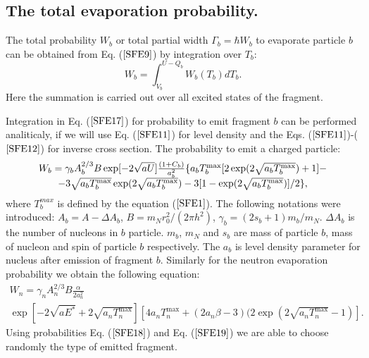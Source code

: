 \subsection{The total evaporation probability.} 

\hspace{1.0em}The total probability $W_b$ or total partial width
$\Gamma_b=\hbar W_b$ to evaporate particle $b$ can be obtained from 
Eq. ($\ref{SFE9}$) by integration over $T_b$:
\begin{equation}
\label{SFE17} 
W_{b}=\int_{V_b}^{U-Q_b} W_b(T_b)dT_b.
\end{equation}
Here the summation is carried out over all excited states of the
fragment.
 
Integration in Eq. ($\ref{SFE17}$) for probability to emit fragment $b$
can be performed analiticaly, if we will use Eq. ($\ref{SFE11}$) for level
density and the Eqs. ($\ref{SFE11}$)-($\ref{SFE12}$) for inverse cross
section.
The probability
to emit a charged particle:
\begin{equation}
\label{SFE18} 
\begin{array}{c}
W_{b}=\gamma _bA_b^{2/3}B\exp [-2 
\sqrt{aU}]\frac{(1+C_b)}{a_b^2}\{a_bT_b^{\max }[2\exp (2\sqrt{%
a_bT_b^{\max }})+1]- \\
- 3\sqrt{a_bT_b^{\max }}\exp (2\sqrt{a_bT_b^{\max }}%
)-3[1-\exp (2\sqrt{a_bT_b^{\max }})]/2\}, 
\end{array}
\end{equation}
where $T_b^{max}$ is defined by the equation ($\ref{SFE1}$).
The following notations were introduced: $A_b=A-\Delta A_b$, $%
B=m_Nr_0^2/(2\pi h^2)$, $\gamma _b=(2s_b+1)m_b/m_N$. $\Delta A_b$ is the
number of nucleons in $b$ particle. $m_b$, $m_N$ and $s_b$ are mass of
particle $b$, mass of nucleon and spin of particle $b$ respectively. 
  The $a_b$ is level density parameter for
nucleus after emission of fragment $b$.
Similarly for the neutron evaporation probability we obtain the
following equation:
\begin{equation}
\begin{array}{c}
\label{SFE19}W_{n}
=\gamma _nA_n^{2/3}B\frac \alpha {2a_n^2} \\
\exp [-2\sqrt{aE^{*}}+2\sqrt{a_nT_n^{\max }}]
[4a_nT_n^{\max }+(2a_n\beta -3)(2\exp (2\sqrt{a_nT_n^{\max }}-1)].
\end{array} 
\end{equation}
Using probabilities Eq. ($\ref{SFE18}$) and Eq. ($\ref{SFE19}$) we are 
able to
choose randomly the type of emitted fragment.

